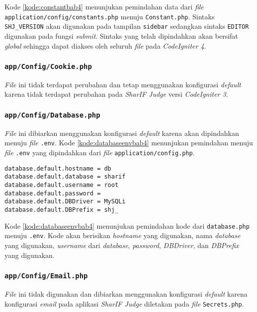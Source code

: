 Kode \ref{kode:constantbab4} menunjukan pemindahan data dari \textit{file} \texttt{application/config/constants.php} menuju \texttt{Constant.php}. Sintaks \texttt{SHJ\_VERSION} akan digunakan pada tampilan \texttt{sidebar} sedangkan sintaks \texttt{EDITOR} digunakan pada fungsi \textit{submit}. Sintaks yang telah dipindahkan akan bersifat \textit{global} sehingga dapat diakses oleh seluruh \textit{file} pada \textit{CodeIgniter 4}.

\subsubsection{\texttt{app/Config/Cookie.php}}
\textit{File} ini tidak terdapat perubahan dan tetap menggunakan konfigurasi \textit{default} karena tidak terdapat perubahan pada \textit{SharIF Judge} versi \textit{CodeIgniter 3}.

\subsubsection{\texttt{app/Config/Database.php}}
\textit{File} ini dibiarkan menggunakan konfigurasi \textit{default} karena akan dipindahkan menuju \textit{file} \texttt{.env}. Kode \ref{kode:databaseenvbab4} menunjukan pemindahan menuju \textit{file} \texttt{.env} yang dipindahkan dari \textit{file} \texttt{application/config.php}.

\begin{lstlisting}[caption=Pemindahan \texttt{app/config/database.php} menuju \texttt{.env}, label=kode:databaseenvbab4]
database.default.hostname = db
database.default.database = sharif
database.default.username = root
database.default.password = 
database.default.DBDriver = MySQLi
database.default.DBPrefix = shj_
\end{lstlisting}

Kode \ref{kode:databaseenvbab4} menunjukan pemindahan kode dari \texttt{database.php} menuju \texttt{.env}. Kode akan berisikan \textit{hostname} yang digunakan, nama \textit{database} yang digunakan, \textit{username} dari \textit{database}, \textit{password}, \textit{DBDriver}, dan \textit{DBPrefix} yang digunakan.

\subsubsection{\texttt{app/Config/Email.php}}
\textit{File} ini tidak digunakan dan dibiarkan menggunakan konfigurasi \textit{default} karena konfigurasi \textit{email} pada aplikasi \textit{SharIF Judge} diletakan pada \textit{file} \texttt{Secrets.php}.

